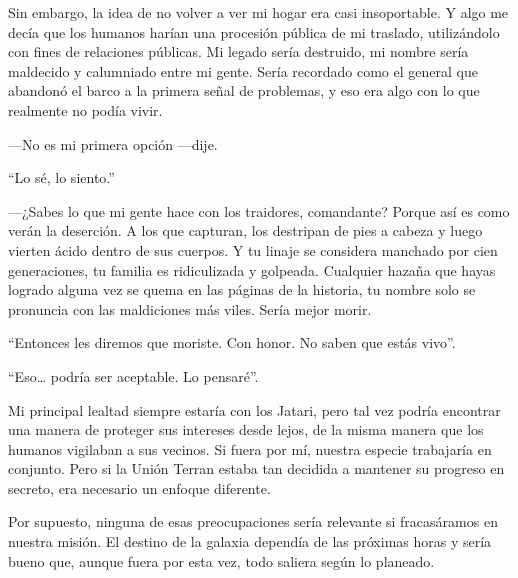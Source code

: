 Sin embargo, la idea de no volver a ver mi hogar era casi insoportable. Y algo me decía que los humanos harían una procesión pública de mi traslado, utilizándolo con fines de relaciones públicas. Mi legado sería destruido, mi nombre sería maldecido y calumniado entre mi gente. Sería recordado como el general que abandonó el barco a la primera señal de problemas, y eso era algo con lo que realmente no podía vivir.

—No es mi primera opción —dije.

``Lo sé, lo siento.''

—¿Sabes lo que mi gente hace con los traidores, comandante? Porque así es como verán la deserción. A los que capturan, los destripan de pies a cabeza y luego vierten ácido dentro de sus cuerpos. Y tu linaje se considera manchado por cien generaciones, tu familia es ridiculizada y golpeada. Cualquier hazaña que hayas logrado alguna vez se quema en las páginas de la historia, tu nombre solo se pronuncia con las maldiciones más viles. Sería mejor morir.

``Entonces les diremos que moriste. Con honor. No saben que estás vivo''.

``Eso… podría ser aceptable. Lo pensaré''.

Mi principal lealtad siempre estaría con los Jatari, pero tal vez podría encontrar una manera de proteger sus intereses desde lejos, de la misma manera que los humanos vigilaban a sus vecinos. Si fuera por mí, nuestra especie trabajaría en conjunto. Pero si la Unión Terran estaba tan decidida a mantener su progreso en secreto, era necesario un enfoque diferente.

Por supuesto, ninguna de esas preocupaciones sería relevante si fracasáramos en nuestra misión. El destino de la galaxia dependía de las próximas horas y sería bueno que, aunque fuera por esta vez, todo saliera según lo planeado.